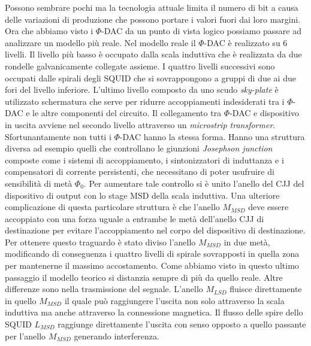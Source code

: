 Possono sembrare pochi ma la tecnologia attuale limita il numero di bit a causa delle variazioni di produzione che possono portare i valori fuori dai loro margini.
Ora che abbiamo visto i $\Phi$-DAC da un punto di vista logico possiamo passare ad analizzare un modello più reale. Nel modello reale il $\Phi$-DAC è realizzato su 6 livelli. Il livello più basso è occupato dalla scala induttiva che è realizzata da due rondelle galvanicamente collegate assieme. I quattro livelli successivi sono occupati dalle spirali degli SQUID che si sovrappongono a gruppi di due ai due fori del livello inferiore. L'ultimo livello composto da uno scudo \textit{sky-plate} è utilizzato schermatura che serve per ridurre accoppiamenti indesiderati tra i $\Phi$-DAC e le altre componenti del circuito. Il collegamento tra $\Phi$-DAC e dispositivo in uscita avviene nel secondo livello attraverso un \textit{microstrip transformer}. Sfortunantamente non tutti i $\Phi$-DAC hanno la stessa forma. Hanno una struttura diversa ad esempio quelli che controllano le giunzioni \textit{Josephson junction} composte  come i sistemi di accoppiamento, i sintonizzatori di induttanza e i compensatori di corrente persistenti, che necessitano di poter usufruire di sensibilità di metà $\Phi_0$. Per aumentare tale controllo si è unito l'anello del CJJ del dispositivo di output con lo stage MSD della scala induttiva. Una ulteriore complicazione di questa particolare struttura è che l'anello $M_{MSD}$ deve essere accoppiato con una forza uguale a entrambe le metà dell'anello CJJ di destinazione per evitare l'accoppiamento nel corpo del dispositivo di destinazione. Per ottenere questo traguardo è stato diviso l'anello $M_{MSD}$ in due metà, modificando di conseguenza i quattro livelli di spirale sovrapposti in quella zona per mantenerne il massimo accostamento.
Come abbiamo visto in questo ultimo passaggio il modello teorico si distanzia sempre di più da quello reale. Altre differenze sono nella trasmissione del segnale. L'anello $M_{LSD}$ fluisce direttamente in quello $M_{MSD}$ il quale può raggiungere l'uscita non solo attraverso la scala induttiva ma anche attraverso la connessione magnetica. Il flusso delle spire dello SQUID $L_{MSD}$ raggiunge direttamente l'uscita con senso opposto a quello passante per l'anello $M_{MSD}$ generando interferenza.
